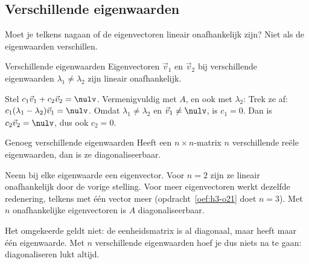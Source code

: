 \subsection{Verschillende eigenwaarden}

Moet je telkens nagaan of de eigenvectoren lineair onafhankelijk zijn? Niet als de eigenwaarden verschillen.

\begin{theorie}
\begin{stelling}{Verschillende eigenwaarden}
Eigenvectoren $\vec v_1$ en $\vec v_2$ bij verschillende eigenwaarden $\lambda_1 \neq \lambda_2$ zijn lineair onafhankelijk.
\end{stelling}

\begin{bewijs}
Stel $c_1\vec v_1 + c_2\vec v_2 = \nulv$. Vermenigvuldig met $A$, en ook met $\lambda_2$:
Trek ze af: $c_1(\lambda_1 - \lambda_2)\vec v_1 = \nulv$. Omdat $\lambda_1 \neq \lambda_2$ en $\vec v_1 \neq \nulv$, is $c_1 = 0$. Dan is $c_2\vec v_2 = \nulv$, dus ook $c_2 = 0$.
\end{bewijs}

\begin{stelling}{Genoeg verschillende eigenwaarden}
Heeft een $n \times n$-matrix $n$ verschillende reële eigenwaarden, dan is ze diagonaliseerbaar.
\end{stelling}

\begin{bewijs}
Neem bij elke eigenwaarde een eigenvector. Voor $n = 2$ zijn ze lineair onafhankelijk door de vorige stelling. Voor meer eigenvectoren werkt dezelfde redenering, telkens met één vector meer (opdracht~\ref{oef:h3-o21} doet $n = 3$). Met $n$ onafhankelijke eigenvectoren is $A$ diagonaliseerbaar.
\end{bewijs}
\end{theorie}

Het omgekeerde geldt niet: de eenheidsmatrix is al diagonaal, maar heeft maar één eigenwaarde. Met $n$ verschillende eigenwaarden hoef je dus niets na te gaan: diagonaliseren lukt altijd.

